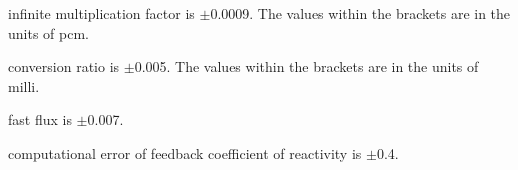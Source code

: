 \begin{landscape}
\begin{table}[ht!]
\begin{threeparttable}[t]
			\DIFaddFL{\rule{0in}{1.2em}$^\dagger$}\scriptsize {}\DIFaddendFL infinite multiplication factor is $\pm$0.0009. The values within the brackets are in the units of pcm.
\DIFdelbeginFL %
\DIFdelendFL \DIFaddbeginFL

			\DIFaddFL{\rule{0in}{1.2em}$^\ddagger$}\scriptsize {}\DIFaddendFL conversion ratio is $\pm$0.005. The values within the brackets are in the units of milli.
\DIFdelbeginFL %
\DIFdelendFL \DIFaddbeginFL

			\DIFaddFL{\rule{0in}{1.2em}$^\perp$}\scriptsize {}\DIFaddendFL fast flux is $\pm$0.007.
\DIFdelbeginFL %
\DIFdelendFL \DIFaddbeginFL

			\DIFaddFL{\rule{0in}{1.2em}$^\wedge$}\scriptsize {}\DIFaddendFL computational error of \DIFaddbeginFL {}\DIFaddendFL feedback coefficient of reactivity is $\pm$0.4.
\DIFdelbeginFL %
\DIFdelendFL \DIFaddbeginFL

		\DIFaddendFL \end{threeparttable}
		\label{table:optimaldesigns}
	\end{table}
\DIFaddbegin

\DIFaddend \end{landscape}
\DIFaddbegin

\DIFaddend %
